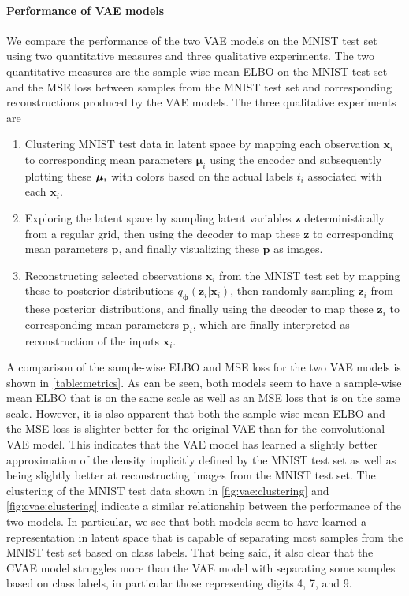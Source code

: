 \paragraph{Performance of VAE models}
We compare the performance of the two VAE models on the MNIST test set using two quantitative measures and three qualitative experiments. The two quantitative measures are the sample-wise mean ELBO on the MNIST test set and the MSE loss between samples from the MNIST test set and corresponding reconstructions produced by the VAE models. The three qualitative experiments are
\begin{enumerate}
    \item Clustering MNIST test data in latent space by mapping each observation $\bm{x}_i$ to corresponding mean parameters $\bm{\mu}_i$ using the encoder and subsequently plotting these $\bm{\mu_}i$ with colors based on the actual labels $t_i$ associated with each $\bm{x}_i$.
    \item Exploring the latent space by sampling latent variables $\bm{z}$ deterministically from a regular grid, then using the decoder to map these $\bm{z}$ to corresponding mean parameters $\bm{p}$,  and finally visualizing these $\bm{p}$ as images.
    \item Reconstructing selected observations $\bm{x}_i$ from the MNIST test set by mapping these to posterior distributions $q_{\bm{\phi}}(\bm{z}_i|\bm{x}_i)$, then randomly sampling $\bm{z}_i$ from these posterior distributions, and finally using the decoder to map these $\bm{z}_i$ to corresponding mean parameters $\bm{p}_i$, which are finally interpreted as reconstruction of the inputs $\bm{x}_i$.
\end{enumerate}
A comparison of the sample-wise ELBO and MSE loss for the two VAE models is shown in \cref{table:metrics}. As can be seen, both models seem to have a sample-wise mean ELBO that is on the same scale as well as an MSE loss that is on the same scale. However, it is also apparent that both the sample-wise mean ELBO and the MSE loss is slighter better for the original VAE than for the convolutional VAE model. This indicates that the VAE model has learned a slightly better approximation of the density implicitly defined by the MNIST test set as well as being slightly better at reconstructing images from the MNIST test set. The clustering of the MNIST test data shown in \cref{fig:vae:clustering} and \cref{fig:cvae:clustering} indicate a similar relationship between the performance of the two models. In particular, we see that both models seem to have learned a representation in latent space that is capable of separating most samples from the MNIST test set based on class labels. That being said, it also clear that the CVAE model struggles more than the VAE model with separating some samples based on class labels, in particular those representing digits 4, 7, and 9. 

